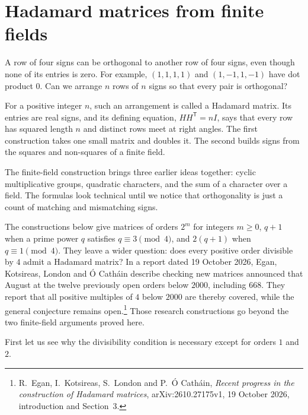 \chapter{Hadamard matrices from finite fields}\label{ch:paley}


A row of four signs can be orthogonal to another row of four signs, even though none of its entries is zero. For example, $(1,1,1,1)$ and $(1,-1,1,-1)$ have dot product $0$. Can we arrange $n$ rows of $n$ signs so that every pair is orthogonal?

For a positive integer $n$, such an arrangement is called a Hadamard matrix.
Its entries are real signs, and its defining equation, $HH^{\mathsf T}=nI$,
says that every row has squared length $n$ and distinct rows meet at right
angles. The first construction takes one small matrix and doubles it. The
second builds signs from the squares and non-squares of a finite field.

The finite-field construction brings three earlier ideas together: cyclic multiplicative groups, quadratic characters, and the sum of a character over a field. The formulas look technical until we notice that orthogonality is just a count of matching and mismatching signs.

The constructions below give matrices of orders $2^m$ for integers $m\ge0$,
$q+1$ when a prime power $q$ satisfies $q\equiv3\pmod4$, and $2(q+1)$
when $q\equiv1\pmod4$. They leave a wider question: does every positive
order divisible by $4$ admit a Hadamard matrix? In a report dated
19 October 2026, Egan, Kotsireas, London and \'O Cath\'ain describe checking
new matrices announced that August at the twelve previously open orders
below $2000$, including $668$. They report that all positive multiples of
$4$ below $2000$ are thereby covered, while the general conjecture remains
open.\footnote{R.~Egan, I.~Kotsireas, S.~London and P.~\'O Cath\'ain,
\emph{Recent progress in the construction of Hadamard matrices},
arXiv:2610.27175v1, 19 October 2026, introduction and Section~3.}
Those research constructions go beyond the two finite-field arguments proved here.

First let us see why the divisibility condition is necessary except for orders $1$ and $2$.

